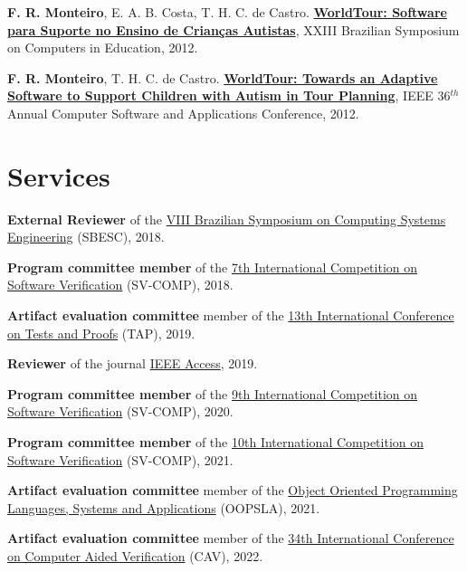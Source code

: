 \documentclass[letterpaper]{article}
\renewenvironment{itemize}{
  \begin{list}{}{
    \setlength{\leftmargin}{1.5em}
  }
}{
  \end{list}
}
\begin{document}
\begin{itemize}
    \item {\bf F. R. Monteiro}, E. A. B. Costa, T. H. C. de Castro. \href{http://www.br-ie.org/pub/index.php/sbie/article/view/1806}{{\bf WorldTour: Software para Suporte no Ensino de Crian{\c c}as Autistas}},
  XXIII Brazilian Symposium on Computers in Education, 2012.
    
    \item {\bf F. R. Monteiro}, T. H. C. de Castro. \href{http://ieeexplore.ieee.org/abstract/document/6340181/}{{\bf WorldTour: Towards an Adaptive Software to Support Children with Autism in Tour Planning}},
  IEEE 36$^{th}$ Annual Computer Software and Applications Conference, 2012.

\end{itemize}


\section*{Services}
\begin{itemize}
  \item {\bf External Reviewer} of the \href{https://www.computer.org/csdl/proceedings-article/sbesc/2018/024000z015/19m3lVxurZe}{VIII Brazilian Symposium on Computing Systems Engineering} (SBESC), 2018.
  
  \item {\bf Program committee member} of the \href{https://sv-comp.sosy-lab.org/2018/committee.php}{7th International Competition on Software Verification} (SV-COMP), 2018.
  
  \item {\bf Artifact evaluation committee} member of the \href{https://tap.sosy-lab.org/2019/committee.php}{13th International Conference on Tests and Proofs} (TAP), 2019.
  
  \item {\bf Reviewer} of the journal \href{https://ieeeaccess.ieee.org}{IEEE Access}, 2019.
  
  \item {\bf Program committee member} of the \href{https://sv-comp.sosy-lab.org/2020/committee.php}{9th International Competition on Software Verification} (SV-COMP), 2020.
  
  \item {\bf Program committee member} of the \href{https://sv-comp.sosy-lab.org/2021/committee.php}{10th International Competition on Software Verification} (SV-COMP), 2021.
  
    \item {\bf Artifact evaluation committee} member of the \href{https://2021.splashcon.org/track/splash-2021-Artifacts}{Object Oriented Programming Languages, Systems and Applications} (OOPSLA), 2021.
    
      \item {\bf Artifact evaluation committee} member of the \href{http://i-cav.org/2022/organization/}{34th International Conference on Computer Aided Verification} (CAV), 2022.
\end{itemize}
\end{document}
